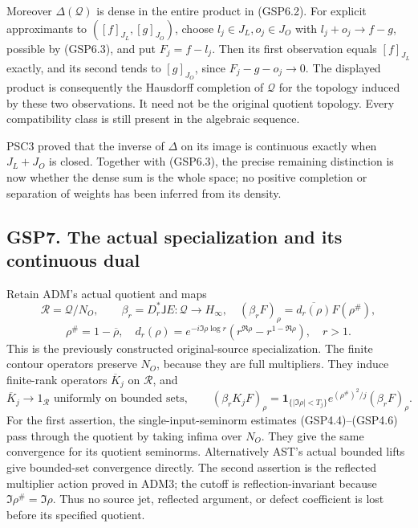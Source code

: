 Moreover \(\Delta(\mathcal Q)\) is dense in the entire product in
(GSP6.2). For explicit approximants to \(([f]_{J_L},[g]_{J_O})\), choose
\(l_j\in J_L,o_j\in J_O\) with \(l_j+o_j\to f-g\), possible by (GSP6.3),
and put \(F_j=f-l_j\). Then its first observation equals \([f]_{J_L}\)
exactly, and its second tends to \([g]_{J_O}\), since \(F_j-g-o_j\to0\).
The displayed product is consequently the Hausdorff completion of
\(\mathcal Q\) for the topology induced by these two observations. It
need not be the original quotient topology. Every compatibility class is
still present in the algebraic sequence.

PSC3 proved that the inverse of \(\Delta\) on its image is continuous
exactly when \(J_L+J_O\) is closed. Together with (GSP6.3), the precise
remaining distinction is now whether the dense sum is the whole space;
no positive completion or separation of weights has been inferred from
its density.

\subsection{GSP7. The actual specialization and its continuous
dual}\label{gsp7.-the-actual-specialization-and-its-continuous-dual}

Retain ADM's actual quotient and maps \[
\mathcal R=\mathcal Q/N_O,\qquad
\beta_r=D_r^*\mathsf J E:\mathcal Q\to H_\infty,
\quad (\beta_rF)_\rho=\overline{d_r(\rho)}F(\rho^\#),
\] \[
\rho^\#=1-\overline\rho,\quad
d_r(\rho)=e^{-i\Im\rho\log r}
(r^{\Re\rho}-r^{1-\Re\rho}),\quad r>1.
\tag{GSP7.1}
\] This is the previously constructed original-source specialization.
The finite contour operators preserve \(N_O\), because they are full
multipliers. They induce finite-rank operators \(\overline K_j\) on
\(\mathcal R\), and \[
\overline K_j\longrightarrow1_{\mathcal R}
\text{ uniformly on bounded sets},\qquad
(\beta_rK_jF)_\rho=
\mathbf1_{\{|\Im\rho|<T_j\}}e^{(\rho^\#)^2/j}(\beta_rF)_\rho.
\tag{GSP7.2}
\] For the first assertion, the single-input-seminorm estimates
(GSP4.4)--(GSP4.6) pass through the quotient by taking infima over
\(N_O\). They give the same convergence for its quotient seminorms.
Alternatively AST's actual bounded lifts give bounded-set convergence
directly. The second assertion is the reflected multiplier action proved
in ADM3; the cutoff is reflection-invariant because
\(\Im\rho^\#=\Im\rho\). Thus no source jet, reflected argument, or
defect coefficient is lost before its specified quotient.

